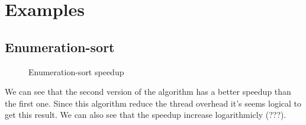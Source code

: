 \chapter{Examples}

\section{Enumeration-sort}

\begin{figure}[H]
  \begin{center}
  \end{center}
  \caption{Enumeration-sort speedup}
  \label{fig:enum_sort}
\end{figure}

We can see that the second version of the algorithm has a better speedup than the first one. Since this algorithm reduce the thread overhead it's seems logical to get this result. We can also see that the speedup increase logarithmicly (???).

